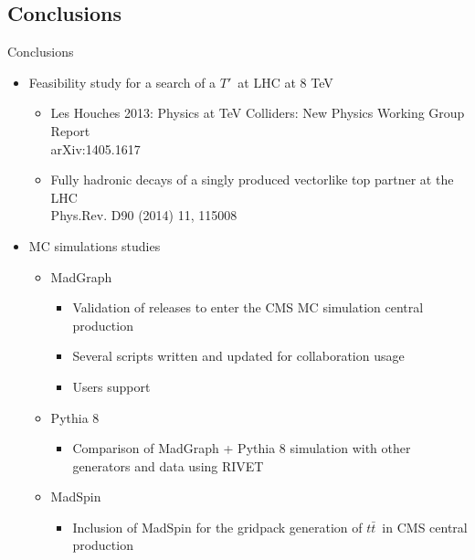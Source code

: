 \documentclass[usenames,dvipsnames]{beamer}
\newcommand{\ttbar}{$t\bar{t}$}
\newcommand{\Tp}{$T'$}
\begin{document}
\subsection{Conclusions}
\begin{frame}{Conclusions}
\vspace{-.5cm}
\begin{block}{}
\begin{itemize}\scriptsize
  \item Feasibility study for a search of a \Tp~at LHC at 8 TeV
    \begin{itemize}\tiny
      \item Les Houches 2013: Physics at TeV Colliders: New Physics Working Group Report \\arXiv:1405.1617
      \item Fully hadronic decays of a singly produced vectorlike top partner at the LHC \\Phys.Rev. D90 (2014) 11, 115008
    \end{itemize}
  \item MC simulations studies
    \begin{itemize}\scriptsize
      \item MadGraph
        \begin{itemize}\tiny
          \item Validation of releases to enter the CMS MC simulation central production
          \item Several scripts written and updated for collaboration usage
          \item Users support
        \end{itemize}
      \item Pythia 8
        \begin{itemize}\tiny
          \item Comparison of MadGraph + Pythia 8 simulation with other generators and data using RIVET
        \end{itemize}
      \item MadSpin        
        \begin{itemize}\tiny
          \item Inclusion of MadSpin for the gridpack generation of \ttbar~in CMS central production

\end{itemize}
\end{itemize}
\end{itemize}
\end{block}
\end{frame}
\end{document}
